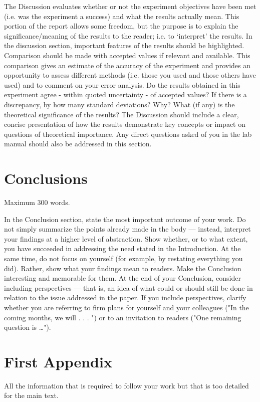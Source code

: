 \documentclass[12pt]{article}
\begin{document}
The Discussion evaluates whether or not the experiment objectives have been met (i.e. was the experiment a success) and what the results actually mean. This portion of the report allows some freedom, but the purpose is to explain the significance/meaning of the results to the reader; i.e. to ‘interpret’ the results.  
In the discussion section, important features of the results should be highlighted. Comparison should be made with accepted values if relevant and available.  This comparison gives an estimate of the accuracy of the experiment and provides an opportunity to assess different methods (i.e. those you used and those others have used) and to comment on your error analysis. Do the results obtained in this experiment agree - within quoted uncertainty - of accepted values? If there is a discrepancy, by how many standard deviations?  Why? 
What (if any) is the theoretical significance of the results? The Discussion should include a clear, concise presentation of how the results demonstrate key concepts or impact on questions of theoretical importance. Any direct questions asked of you in the lab manual should also be addressed in this section.

\section{Conclusions}
Maximum 300 words.

In the Conclusion section, state the most important outcome of your work. Do not simply summarize the points already made in the body — instead, interpret your findings at a higher level of abstraction. Show whether, or to what extent, you have succeeded in addressing the need stated in the Introduction. At the same time, do not focus on yourself (for example, by restating everything you did). Rather, show what your findings mean to readers. Make the Conclusion interesting and memorable for them. 
At the end of your Conclusion, consider including perspectives — that is, an idea of what could or should still be done in relation to the issue addressed in the paper. If you include perspectives, clarify whether you are referring to firm plans for yourself and your colleagues ("In the coming months, we will . . . ") or to an invitation to readers ("One remaining question is \dots ").


\newpage
\appendix
\section{First Appendix}
All the information that is required to follow your work but that is too detailed for the main text.
\end{document}
